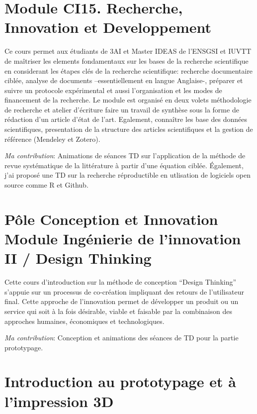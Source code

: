 \documentclass[
  12pt,
  oneside]{book}
\begin{document}
\hypertarget{module-ci15.-recherche-innovation-et-developpement}{%
\section{Module CI15. Recherche, Innovation et Developpement}\label{module-ci15.-recherche-innovation-et-developpement}}

Ce cours permet aux étudiants de 3AI et Master IDEAS de l'ENSGSI et IUVTT de maîtriser les elements fondamentaux sur les bases de la recherche scientifique en considerant les étapes clés de la recherche scientifique: recherche documentaire ciblée, analyse de documents --essentiellement en langue Anglaise-, préparer et suivre un protocole expérimental et aussi l'organisation et les modes de financement de la recherche. Le module est organisé en deux volets méthodologie de recherche et atelier d'écriture faire un travail de synthèse sous la forme de rédaction d'un article d'état de l'art. Egalement, connaître les base des données scientifiques, presentation de la structure des articles scientifiques et la gestion de référence (Mendeley et Zotero).

\emph{Ma contribution}: Animations de séances TD sur l'application de la méthode de revue systématique de la littérature à partir d'une équation ciblée. Également, j'ai proposé une TD sur la recherche réproductible en utlisation de logiciels open source comme R et Github.

\hypertarget{puxf4le-conception-et-innovation-module-inguxe9nierie-de-linnovation-ii-design-thinking}{%
\section{Pôle Conception et Innovation Module Ingénierie de l'innovation II / Design Thinking}\label{puxf4le-conception-et-innovation-module-inguxe9nierie-de-linnovation-ii-design-thinking}}

Cette cours d'introduction sur la méthode de conception ``Design Thinking'' s'appuie sur un processus de co-création impliquant des retours de l'utilisateur final. Cette approche de l'innovation permet de développer un produit ou un service qui soit à la fois désirable, viable et faisable par la combinaison des approches humaines, économiques et technologiques.

\emph{Ma contribution}: Conception et animations des séances de TD pour la partie prototypage.

\hypertarget{introduction-au-prototypage-et-uxe0-limpression-3d}{%
\section{Introduction au prototypage et à l'impression 3D}\label{introduction-au-prototypage-et-uxe0-limpression-3d}}
\end{document}
